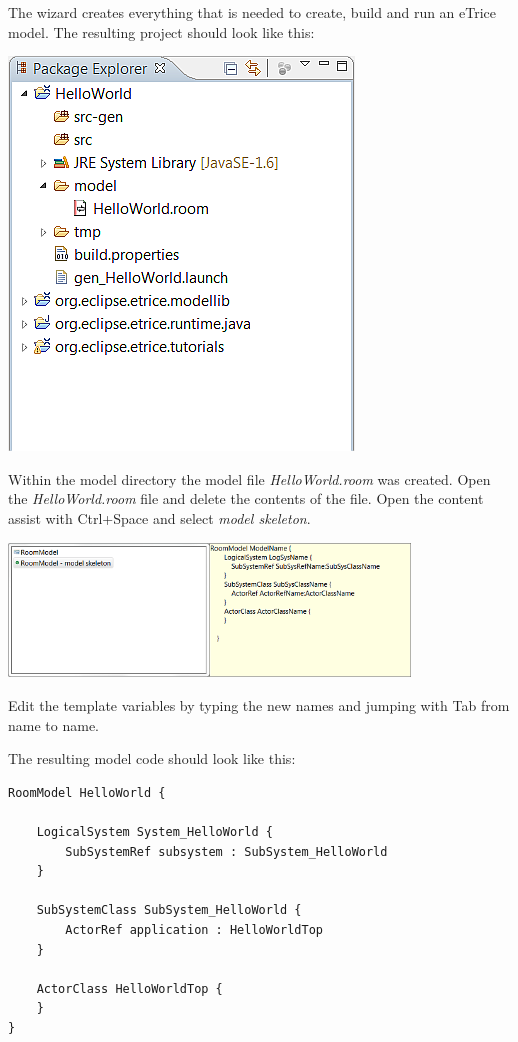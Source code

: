 The wizard creates everything that is needed to create, build and run an eTrice model. The resulting project should look like this:

\includegraphics{images/015-HelloWorld11.png}

Within the model directory the model file \textit{HelloWorld.room} was created. Open the \textit{HelloWorld.room} file and delete the contents of the file. Open the content assist with Ctrl+Space and select \textit{model skeleton}.

\includegraphics[width=0.8\textwidth]{images/015-HelloWorld12.png}

Edit the template variables by typing the new names and jumping with Tab from name to name.

The resulting model code should look like this:

\begin{verbatim}
RoomModel HelloWorld {

    LogicalSystem System_HelloWorld {
        SubSystemRef subsystem : SubSystem_HelloWorld
    }

    SubSystemClass SubSystem_HelloWorld {
        ActorRef application : HelloWorldTop
    }

    ActorClass HelloWorldTop {
    }
} 
\end{verbatim}

